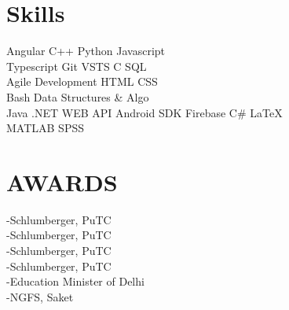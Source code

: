 \documentclass[a4paper]{deedy-resume-openfont}
\begin{document}
\begin{minipage}[t]{0.33\textwidth}
\section{Skills}
Angular \textbullet{}   C++ \textbullet{} Python \textbullet{} Javascript \textbullet{}\\
Typescript \textbullet{} Git \textbullet{} VSTS \textbullet{} C \textbullet{} SQL \textbullet{}\\ 
Agile Development \textbullet{} HTML \textbullet{} CSS \textbullet{} \\
Bash \textbullet{} Data Structures \& Algo \\
Java \textbullet{} .NET WEB API \textbullet{} Android SDK \textbullet{} Firebase \textbullet{} C\# \textbullet{} \LaTeX\  \\
MATLAB \textbullet{} SPSS 
\sectionsep



\section{AWARDS}
\textbullet{}  -Schlumberger, PuTC \\
\textbullet{}  -Schlumberger, PuTC \\
\textbullet{}  -Schlumberger, PuTC \\
\textbullet{}  -Schlumberger, PuTC \\
\textbullet{}  -Education Minister of Delhi \\
\textbullet{}  -NGFS, Saket \\
\sectionsep


\end{minipage}
\end{document}
